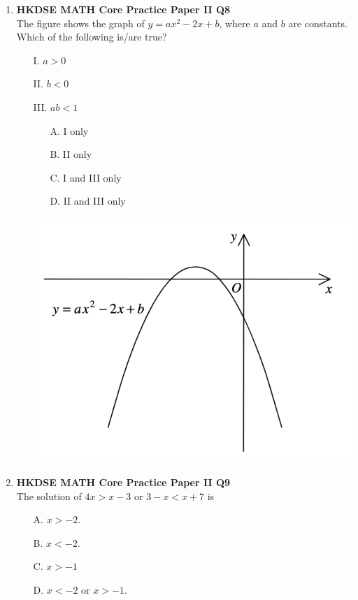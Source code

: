 \documentclass[12pt]{article}
\begin{document}
\begin{enumerate}
	\item \textbf{HKDSE MATH Core Practice Paper II Q8}\\
	The figure shows the graph of $y = ax^2 - 2x + b$, where $a$ and $b$ are constants. Which of the following is/are true?
	\begin{enumerate}
		\item[I.] $a > 0$
		\item[II.] $b < 0$
		\item[III.] $ab < 1$
		\item[]
			\begin{minipage}[u]{.39\textwidth}
				\begin{enumerate}
					\item[A.] I only
					\item[B.] II only
					\item[C.] I and III only
					\item[D.] II and III only
				\end{enumerate}
			\end{minipage}
			\begin{minipage}[u]{.5\textwidth}
				\centering
				\includegraphics[scale=0.6]{PPFigure2.8.png}
			\end{minipage}
	\end{enumerate}
		
	\item \textbf{HKDSE MATH Core Practice Paper II Q9}\\
	The solution of $4x > x - 3$ or $3 - x < x + 7$ is
	\begin{enumerate}
		\item[A.] $x > -2$.
		\item[B.] $x < -2$.
		\item[C.] $x > -1$
		\item[D.] $x < -2$ or $x > -1$.
	\end{enumerate}


\end{enumerate}
\end{document}
